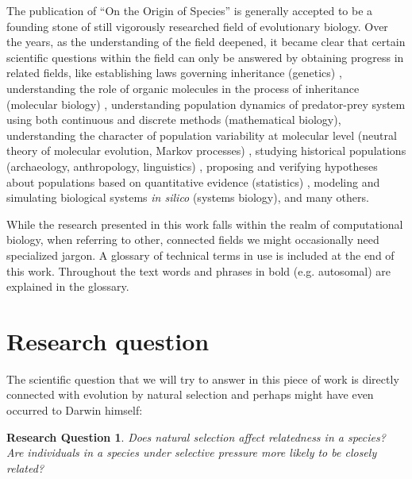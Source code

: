 \documentclass{l4proj}
\newtheorem*{quest}{Research Question}
\begin{document}
The publication of ``On the Origin of Species'' \parencite{darwin59} is generally accepted to be a founding stone of still vigorously researched field of evolutionary biology. Over the years, as the understanding of the field deepened, it became clear that certain scientific questions within the field can only be answered by obtaining progress in related fields, like establishing laws governing inheritance (genetics) \parencite{mendel}, understanding the role of organic molecules in the process of inheritance (molecular biology) \parencite{watson53}, understanding population dynamics of predator-prey system using both continuous and discrete methods (mathematical biology), understanding the character of population variability at molecular level (neutral theory of molecular evolution, Markov processes) \parencite{kimura68, dayhoff73}, studying historical populations (archaeology, anthropology, linguistics) \parencite{dubois}, proposing and verifying hypotheses about populations based on quantitative evidence (statistics) \parencite{bronzeAgeEurasia}, modeling and simulating biological systems \textit{in silico} (systems biology), and many others.

While the research presented in this work falls within the realm of computational biology, when referring to other, connected fields we might occasionally need specialized jargon. A glossary of technical terms in use is included at the end of this work. Throughout the text words and phrases in bold (e.g. \gls{autosomal}) are explained in the glossary.

\section{Research question}\label{TMRCA}
The scientific question that we will try to answer in this piece of work is directly connected with evolution by natural selection and perhaps might have even occurred to Darwin himself:

\begin{quest}
Does natural selection affect relatedness in a species? Are individuals in a species under selective pressure more likely to be closely related?
\end{quest}
\end{document}

